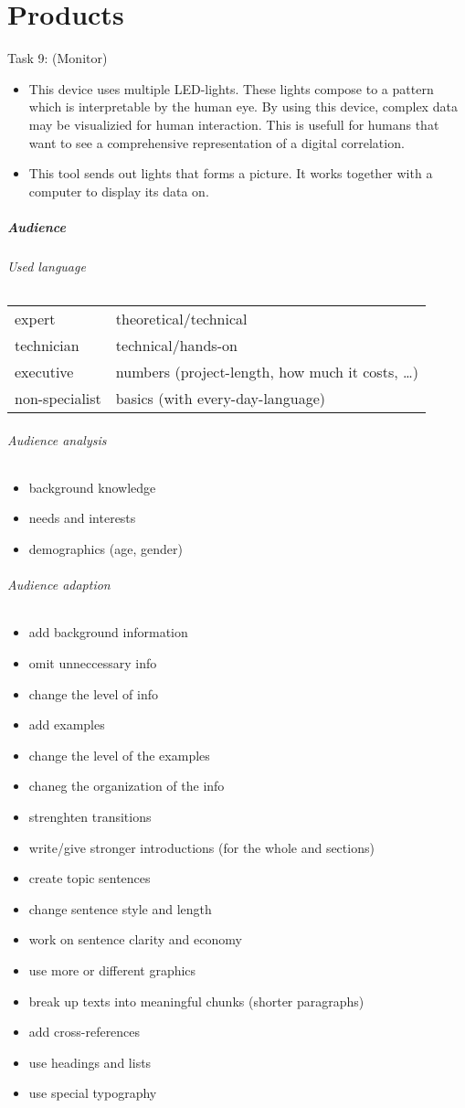 \chapter{Products}

Task 9: (Monitor)
\begin{itemize}
\item This device uses multiple LED-lights. These lights compose to a pattern which is interpretable by the human eye. By using this device, complex data may be visualizied for human interaction. This is usefull for humans that want to see a comprehensive representation of a digital correlation.
\item This tool sends out lights that forms a picture. It works together with a computer to display its data on.
\end{itemize}

\paragraph{Audience}
\subparagraph{Used language} \parskp
\begin{tabular}{l l}
expert & theoretical/technical\\
technician & technical/hands-on\\
executive & numbers (project-length, how much it costs, …)\\
non-specialist & basics (with every-day-language)
\end{tabular}

\subparagraph{Audience analysis}
\begin{itemize}
\item background knowledge
\item needs and interests
\item demographics (age, gender)
\end{itemize}

\subparagraph{Audience adaption}
\begin{itemize}
\item add background information
\item omit unneccessary info
\item change the level of info
\item add examples
\item change the level of the examples
\item chaneg the organization of the info
\item strenghten transitions
\item write/give stronger introductions (for the whole and sections)
\item create topic sentences
\item change sentence style and length
\item work on sentence clarity and economy
\item use more or different graphics
\item break up texts into meaningful chunks (shorter paragraphs)
\item add cross-references
\item use headings and lists
\item use special typography
\end{itemize}


